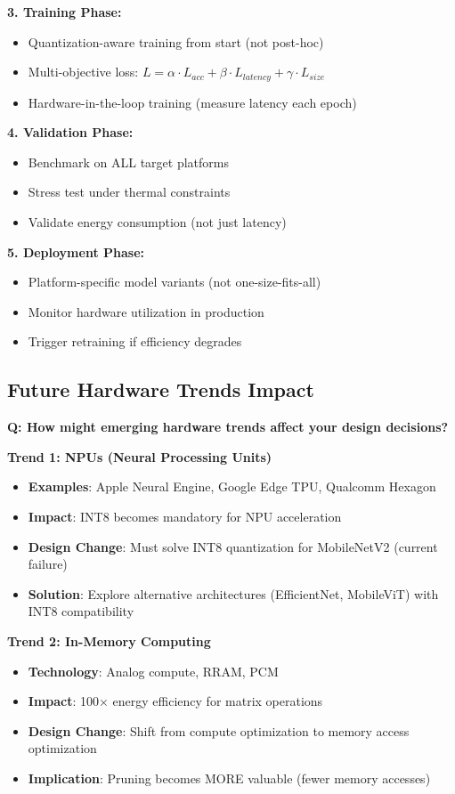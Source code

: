 \documentclass[10pt, a4paper]{article}
\begin{document}
\textbf{3. Training Phase:}
\begin{itemize}
    \item Quantization-aware training from start (not post-hoc)
    \item Multi-objective loss: $L = \alpha \cdot L_{acc} + \beta \cdot L_{latency} + \gamma \cdot L_{size}$
    \item Hardware-in-the-loop training (measure latency each epoch)
\end{itemize}

\textbf{4. Validation Phase:}
\begin{itemize}
    \item Benchmark on ALL target platforms
    \item Stress test under thermal constraints
    \item Validate energy consumption (not just latency)
\end{itemize}

\textbf{5. Deployment Phase:}
\begin{itemize}
    \item Platform-specific model variants (not one-size-fits-all)
    \item Monitor hardware utilization in production
    \item Trigger retraining if efficiency degrades
\end{itemize}

\subsection{Future Hardware Trends Impact}

\textbf{Q: How might emerging hardware trends affect your design decisions?}

\textbf{Trend 1: NPUs (Neural Processing Units)}
\begin{itemize}
    \item \textbf{Examples}: Apple Neural Engine, Google Edge TPU, Qualcomm Hexagon
    \item \textbf{Impact}: INT8 becomes mandatory for NPU acceleration
    \item \textbf{Design Change}: Must solve INT8 quantization for MobileNetV2 (current failure)
    \item \textbf{Solution}: Explore alternative architectures (EfficientNet, MobileViT) with INT8 compatibility
\end{itemize}

\textbf{Trend 2: In-Memory Computing}
\begin{itemize}
    \item \textbf{Technology}: Analog compute, RRAM, PCM
    \item \textbf{Impact}: 100× energy efficiency for matrix operations
    \item \textbf{Design Change}: Shift from compute optimization to memory access optimization
    \item \textbf{Implication}: Pruning becomes MORE valuable (fewer memory accesses)
\end{itemize}
\end{document}
